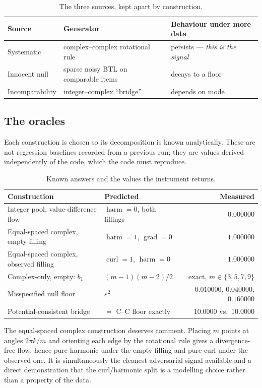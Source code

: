\documentclass[11pt,a4paper]{article}
\newcommand{\grad}{\operatorname{grad}}
\newcommand{\curl}{\operatorname{curl}}
\newcommand{\harm}{\operatorname{harm}}
\begin{document}
\begin{table}[h]
\centering
\small
\begin{tabular}{@{}lll@{}}
\toprule
\textbf{Source} & \textbf{Generator} & \textbf{Behaviour under more data} \\
\midrule
Systematic & complex--complex rotational rule & persists --- \emph{this is the signal} \\
Innocent null & sparse noisy BTL on comparable items & decays to a floor \\
Incomparability & integer--complex ``bridge'' & depends on mode \\
\bottomrule
\end{tabular}
\caption{The three sources, kept apart by construction.}
\end{table}

\subsection{The oracles}

Each construction is chosen so its decomposition is known analytically. These are
not regression baselines recorded from a previous run; they are values derived
independently of the code, which the code must reproduce.

\begin{table}[h]
\centering
\small
\begin{tabular}{@{}llr@{}}
\toprule
\textbf{Construction} & \textbf{Predicted} & \textbf{Measured} \\
\midrule
Integer pool, value-difference flow & $\harm = 0$, both fillings & $0.000000$ \\
Equal-spaced complex, empty filling & $\harm = 1$, $\grad = 0$ & $1.000000$ \\
Equal-spaced complex, observed filling & $\curl = 1$, $\harm = 0$ & $1.000000$ \\
Complex-only, empty: $b_1$ & $(m{-}1)(m{-}2)/2$ & exact, $m\in\{3,5,7,9\}$ \\
Misspecified null floor & $\varepsilon^2$ & $0.010000$, $0.040000$, $0.160000$ \\
Potential-consistent bridge & $=$ C--C floor exactly & $10.0000$ vs.\ $10.0000$ \\
\bottomrule
\end{tabular}
\caption{\label{tab:oracles}Known answers and the values the instrument returns.}
\end{table}

The equal-spaced complex construction deserves comment. Placing $m$ points at
angles $2\pi k/m$ and orienting each edge by the rotational rule gives a
divergence-free flow, hence pure harmonic under the empty filling and pure curl
under the observed one. It is simultaneously the cleanest adversarial signal
available and a direct demonstration that the curl/harmonic split is a modelling
choice rather than a property of the data.
\end{document}
